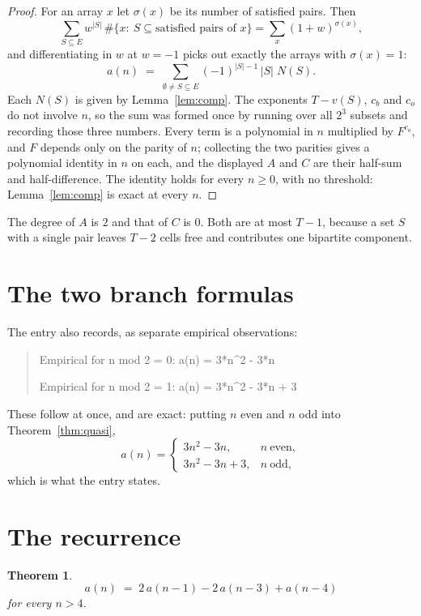 \documentclass[11pt,a4paper]{article}
\theoremstyle{plain}
\newtheorem{theorem}{Theorem}
\theoremstyle{definition}
\begin{document}
\begin{proof}
For an array $x$ let $\sigma(x)$ be its number of satisfied pairs. Then
\[
\sum_{S\subseteq E}w^{|S|}\,\#\{x:\ S\subseteq\text{satisfied pairs of }x\}
=\sum_x (1+w)^{\sigma(x)},
\]
and differentiating in $w$ at $w=-1$ picks out exactly the arrays with $\sigma(x)=1$:
\[
a(n)\;=\;\sum_{\emptyset\neq S\subseteq E}(-1)^{|S|-1}\,|S|\;N(S).
\]
Each $N(S)$ is given by Lemma~\ref{lem:comp}. The exponents $T-v(S)$, $c_b$ and $c_o$ do not
involve $n$, so the sum was formed once by running over all $2^{3}$ subsets and
recording those three numbers. Every term is a polynomial in $n$ multiplied by $F^{c_o}$, and
$F$ depends only on the parity of $n$; collecting the two parities gives a polynomial identity
in $n$ on each, and the displayed $A$ and $C$ are their half-sum and half-difference. The
identity holds for every $n\ge0$, with no threshold: Lemma~\ref{lem:comp} is exact at every
$n$.
\end{proof}

The degree of $A$ is $2$ and that of $C$ is $0$. Both are at most $T-1$,
because a set $S$ with a single pair leaves $T-2$ cells free and contributes one bipartite
component.

\section{The two branch formulas}

The entry also records, as separate empirical observations:
\begin{quote}
Empirical for n mod 2 = 0: a(n) = 3*n\^{}2 - 3*n

Empirical for n mod 2 = 1: a(n) = 3*n\^{}2 - 3*n + 3
\end{quote}
These follow at once, and are exact: putting $n$ even and $n$ odd into
Theorem~\ref{thm:quasi},
\[
a(n)=\begin{cases}
3n^{2} - 3n, & n\ \text{even},\\[2pt]
3n^{2} - 3n + 3, & n\ \text{odd},
\end{cases}
\]
which is what the entry states.

\section{The recurrence}

\begin{theorem}
\[
a(n)\;=\;2\,a(n-1) - 2\,a(n-3) + a(n-4)
\]
for every $n>4$.
\end{theorem}
\end{document}
